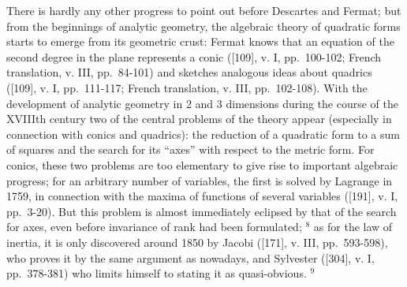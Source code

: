 There is hardly any other progress to point out before Descartes and Fermat; but from the beginnings of analytic geometry, the algebraic theory of quadratic forms starts to emerge from its geometric crust: Fermat knows that an equation of the second degree in the plane represents a conic ({[}109{]}, v. I, pp.~100-102; French translation, v. III, pp.~84-101) and sketches analogous ideas about quadrics ({[}109{]}, v. I, pp.~111-117; French translation, v. III, pp.~102-108). With the development of analytic geometry in 2 and 3 dimensions during the course of the XVIIIth century two of the central problems of the theory appear (especially in connection with conics and quadrics): the reduction of a quadratic form to a sum of squares and the search for its ``axes'' with respect to the metric form. For conics, these two problems are too elementary to give rise to important algebraic progress; for an arbitrary number of variables, the first is solved by Lagrange in 1759, in connection with the maxima of functions of several variables ({[}191{]}, v. I, pp.~3-20). But this problem is almost immediately eclipsed by that of the search for axes, even before invariance of rank had been formulated; \(^{8}\) as for the law of inertia, it is only discovered around 1850 by Jacobi ({[}171{]}, v. III, pp.~593-598), who proves it by the same argument as nowadays, and Sylvester ({[}304{]}, v. I, pp.~378-381) who limits himself to stating it as quasi-obvious. \(^{9}\)

